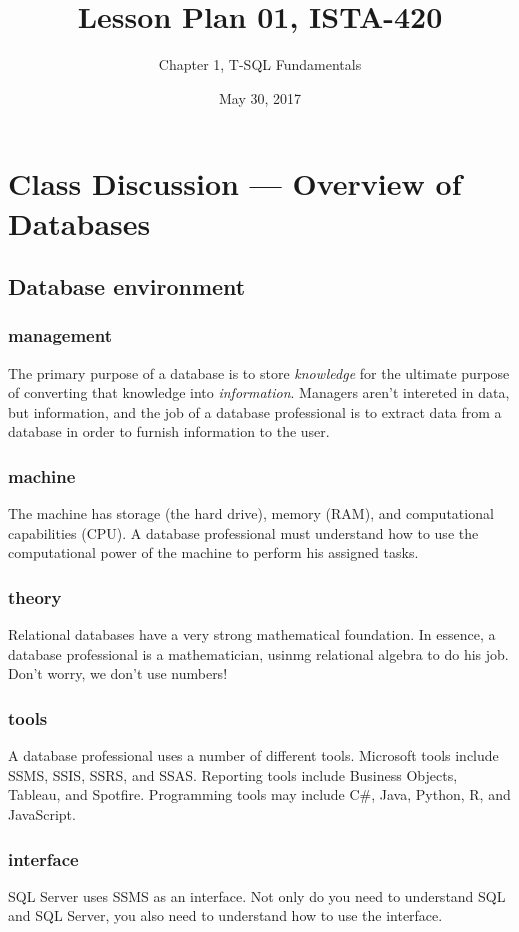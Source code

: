 \documentclass{article}
\title{Lesson Plan 01, ISTA-420}
\author{Chapter 1, T-SQL Fundamentals}
\date{May 30, 2017}
\begin{document}
    

    \maketitle{}


    \section{Class Discussion --- Overview of Databases}


        \subsection{Database environment}
            \subsubsection{management}
            The primary purpose of a database is to store \textit{knowledge} for the ultimate purpose of converting that knowledge into \textit{information}. Managers aren't intereted in data, but information, and the job of a database professional is to extract data from a database in order to furnish information to the user.
            \subsubsection{machine}
            The machine has storage (the hard drive), memory (RAM), and computational capabilities (CPU). A database professional must understand how to use the computational power of the machine to perform his assigned tasks.
            \subsubsection{theory}
            Relational databases have a very strong mathematical foundation. In essence, a database professional is a mathematician, usinmg relational algebra to do his job. Don't worry, we don't use numbers!
            \subsubsection{tools}
            A database professional uses a number of different tools. Microsoft tools include SSMS, SSIS, SSRS, and SSAS. Reporting tools include Business Objects, Tableau, and Spotfire. Programming tools may include C\#, Java, Python, R, and JavaScript.
            \subsubsection{interface}
            SQL Server uses SSMS as an interface. Not only do you need to understand SQL and SQL Server, you also need to understand how to use the interface.
\end{document}
